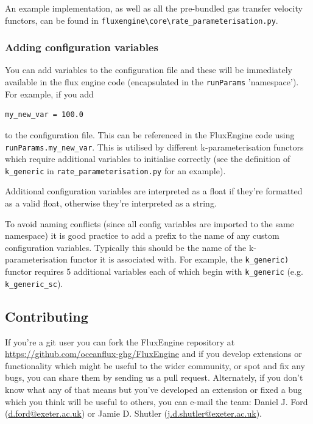 \documentclass[]{scrartcl}
\begin{document}
An example implementation, as well as all the pre-bundled gas transfer velocity functors, can be found in \texttt{fluxengine{\textbackslash}core{\textbackslash}rate\_parameterisation.py}.


\subsubsection{Adding configuration variables} \label{adding_custom_config_variables}
You can add variables to the configuration file and these will be immediately available in the flux engine code (encapsulated in the \texttt{runParams} 'namespace'). For example, if you add
\begin{lstlisting}
my_new_var = 100.0
\end{lstlisting}
to the configuration file. This can be referenced in the FluxEngine code using \texttt{runParams.my\_new\_var}. This is utilised by different k-parameterisation functors which require additional variables to initialise correctly (see the definition of \texttt{k\_generic} in \texttt{rate\_parameterisation.py} for an example).

Additional configuration variables are interpreted as a float if they're formatted as a valid float, otherwise they're interpreted as a string.

To avoid naming conflicts (since all config variables are imported to the same namespace) it is good practice to add a prefix to the name of any custom configuration variables. Typically this should be the name of the k-parameterisation functor it is associated with. For example, the \texttt{k\_generic)} functor requires 5 additional variables each of which begin with \texttt{k\_generic} (e.g. \texttt{k\_generic\_sc}).

\subsection{Contributing}
If you're a git user you can fork the FluxEngine repository at \url{https://github.com/oceanflux-ghg/FluxEngine} and if you develop extensions or functionality which might be useful to the wider community, or spot and fix any bugs, you can share them by sending us a pull request. Alternately, if you don't know what any of that means but you've developed an extension or fixed a bug which you think will be useful to others, you can e-mail the team: Daniel J. Ford (\url{d.ford@exeter.ac.uk}) or Jamie D. Shutler (\url{j.d.shutler@exeter.ac.uk}).
\end{document}
